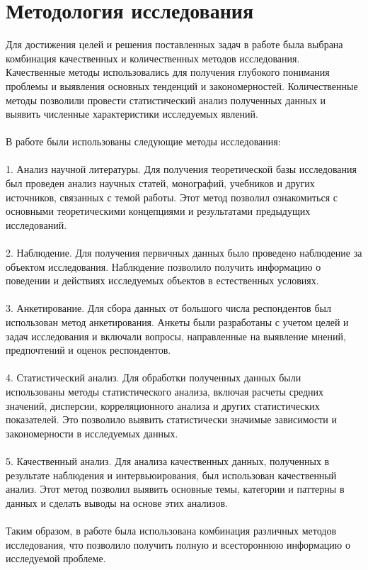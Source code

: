 \documentclass{article}
\begin{document}
\section{Методология исследования}
Для достижения целей и решения поставленных задач в работе была выбрана комбинация качественных и количественных методов исследования. Качественные методы использовались для получения глубокого понимания проблемы и выявления основных тенденций и закономерностей. Количественные методы позволили провести статистический анализ полученных данных и выявить численные характеристики исследуемых явлений.\\
~\\
В работе были использованы следующие методы исследования:\\
~\\
1. Анализ научной литературы. Для получения теоретической базы исследования был проведен анализ научных статей, монографий, учебников и других источников, связанных с темой работы. Этот метод позволил ознакомиться с основными теоретическими концепциями и результатами предыдущих исследований.\\
~\\
2. Наблюдение. Для получения первичных данных было проведено наблюдение за объектом исследования. Наблюдение позволило получить информацию о поведении и действиях исследуемых объектов в естественных условиях.\\
~\\
3. Анкетирование. Для сбора данных от большого числа респондентов был использован метод анкетирования. Анкеты были разработаны с учетом целей и задач исследования и включали вопросы, направленные на выявление мнений, предпочтений и оценок респондентов.\\
~\\
4. Статистический анализ. Для обработки полученных данных были использованы методы статистического анализа, включая расчеты средних значений, дисперсии, корреляционного анализа и других статистических показателей. Это позволило выявить статистически значимые зависимости и закономерности в исследуемых данных.\\
~\\
5. Качественный анализ. Для анализа качественных данных, полученных в результате наблюдения и интервьюирования, был использован качественный анализ. Этот метод позволил выявить основные темы, категории и паттерны в данных и сделать выводы на основе этих анализов.\\
~\\
Таким образом, в работе была использована комбинация различных методов исследования, что позволило получить полную и всестороннюю информацию о исследуемой проблеме.
\end{document}
